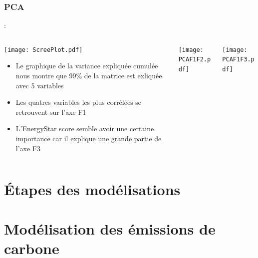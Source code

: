 \documentclass[8pt,aspectratio=169,hyperref={unicode=true}]{beamer}
\begin{document}
\subsubsection{PCA}
\begin{frame}[t]{\insertsection : \insertsubsection}{\insertsubsubsection}
  \begin{columns}
    \begin{column}{.33\textwidth}
      \texttt{[image: ScreePlot.pdf]}
      \begin{itemize}
        \item Le graphique de la variance expliquée cumulée nous montre que
              99\% de la matrice est exliquée avec 5 variables
        \item Les quatres variables les plus corrélées se retrouvent sur l'axe F1
        \item L'EnergyStar score semble avoir une certaine importance car il explique
              une grande partie de l'axe F3
      \end{itemize}
    \end{column}
    \begin{column}{.33\textwidth}
      \centering
      \texttt{[image: PCAF1F2.pdf]}
    \end{column}
    \begin{column}{.33\textwidth}
      \centering
      \texttt{[image: PCAF1F3.pdf]}
    \end{column}
  \end{columns}
\end{frame}

\section{Étapes des modélisations}
\begin{frame}{\insertsection}
  
\end{frame}

\section[Modélisation émissions]{Modélisation des émissions de carbone}
\end{document}
